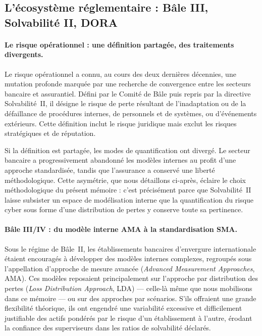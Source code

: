 \documentclass[11pt,a4paper]{article}
\theoremstyle{navystyle}
\theoremstyle{navydef}
\begin{document}
\subsection{L'écosystème réglementaire : Bâle III, Solvabilité II, DORA}

\paragraph{Le risque opérationnel : une définition partagée, des traitements divergents.}
Le risque opérationnel a connu, au cours des deux dernières décennies, une mutation
profonde marquée par une recherche de convergence entre les secteurs bancaire et
assurantiel. Défini par le Comité de Bâle puis repris par la directive Solvabilité~II,
il désigne le risque de perte résultant de l'inadaptation ou de la défaillance de
procédures internes, de personnels et de systèmes, ou d'événements extérieurs. Cette
définition inclut le risque juridique mais exclut les risques stratégiques et de
réputation.

Si la définition est partagée, les modes de quantification ont divergé. Le secteur
bancaire a progressivement abandonné les modèles internes au profit d'une approche
standardisée, tandis que l'assurance a conservé une liberté méthodologique. Cette
asymétrie, que nous détaillons ci-après, éclaire le choix méthodologique du présent
mémoire : c'est précisément parce que Solvabilité~II laisse subsister un espace de
modélisation interne que la quantification du risque cyber sous forme d'une distribution
de pertes y conserve toute sa pertinence.

\paragraph{Bâle III/IV : du modèle interne AMA à la standardisation SMA.}
Sous le régime de Bâle~II, les établissements bancaires d'envergure internationale
étaient encouragés à développer des modèles internes complexes, regroupés sous
l'appellation d'approche de mesure avancée (\emph{Advanced Measurement Approaches},
AMA). Ces modèles reposaient principalement sur l'approche par distribution des pertes
(\emph{Loss Distribution Approach}, LDA) --- celle-là même que nous mobilisons dans ce
mémoire --- ou sur des approches par scénarios. S'ils offraient une grande flexibilité
théorique, ils ont engendré une variabilité excessive et difficilement justifiable des
actifs pondérés par le risque d'un établissement à l'autre, érodant la confiance des
superviseurs dans les ratios de solvabilité déclarés.
\end{document}
